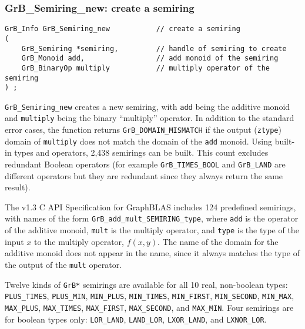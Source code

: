 \documentclass[12pt]{article}
\begin{document}
\subsubsection{{\sf GrB\_Semiring\_new:} create a semiring}
\label{semiring_new}

\begin{mdframed}[userdefinedwidth=6in]
{\footnotesize
\begin{verbatim}
GrB_Info GrB_Semiring_new           // create a semiring
(
    GrB_Semiring *semiring,         // handle of semiring to create
    GrB_Monoid add,                 // add monoid of the semiring
    GrB_BinaryOp multiply           // multiply operator of the semiring
) ;
\end{verbatim}
} \end{mdframed}

\verb'GrB_Semiring_new' creates a new semiring, with \verb'add' being the
additive monoid and \verb'multiply' being the binary ``multiply'' operator.  In
addition to the standard error cases, the function returns
\verb'GrB_DOMAIN_MISMATCH' if the output (\verb'ztype') domain of
\verb'multiply' does not match the domain of the \verb'add' monoid.  Using
built-in types and operators, 2,438 semirings can be built.  This count
excludes redundant Boolean operators (for example \verb'GrB_TIMES_BOOL' and
\verb'GrB_LAND' are different operators but they are redundant since they
always return the same result).

The v1.3 C API Specification for GraphBLAS includes 124 predefined semirings,
with names of the form \verb'GrB_add_mult_SEMIRING_type', where \verb'add' is
the operator of the additive monoid, \verb'mult' is the multiply operator, and
\verb'type' is the type of the input $x$ to the multiply operator, $f(x,y)$.
The name of the domain for the additive monoid does not appear in the name,
since it always matches the type of the output of the \verb'mult' operator.

Twelve kinds of \verb'GrB*' semirings are available for all 10 real, non-boolean types:
    \verb'PLUS_TIMES', \verb'PLUS_MIN',
    \verb'MIN_PLUS', \verb'MIN_TIMES', \verb'MIN_FIRST', \verb'MIN_SECOND', \verb'MIN_MAX',
    \verb'MAX_PLUS', \verb'MAX_TIMES', \verb'MAX_FIRST', \verb'MAX_SECOND', and \verb'MAX_MIN'.
Four semirings are for boolean types only: 
    \verb'LOR_LAND', \verb'LAND_LOR', \verb'LXOR_LAND', and \verb'LXNOR_LOR'.
\end{document}
